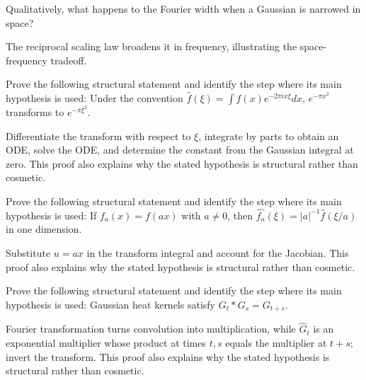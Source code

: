 \begin{problem}\label{prob:iii12-problem-08}
Qualitatively, what happens to the Fourier width when a Gaussian is narrowed in space?
\end{problem}
\begin{solution}
The reciprocal scaling law broadens it in frequency, illustrating the
space-frequency tradeoff.
\end{solution}

\begin{problem}\label{prob:iii12-problem-09}
Prove the following structural statement and identify the step where its main hypothesis is used: Under the convention $\widehat f(\xi)=\int f(x)e^{-2\pi ix\xi}dx$, $e^{-\pi x^2}$ transforms to $e^{-\pi\xi^2}$.
\end{problem}
\begin{solution}
Differentiate the transform with respect to $\xi$, integrate by parts to obtain an ODE, solve the ODE, and determine the constant from the Gaussian integral at zero. This proof also explains why the stated hypothesis is structural rather than cosmetic.
\end{solution}

\begin{problem}\label{prob:iii12-problem-10}
Prove the following structural statement and identify the step where its main hypothesis is used: If $f_a(x)=f(ax)$ with $a\ne0$, then $\widehat{f_a}(\xi)=|a|^{-1}\widehat f(\xi/a)$ in one dimension.
\end{problem}
\begin{solution}
Substitute $u=ax$ in the transform integral and account for the Jacobian. This proof also explains why the stated hypothesis is structural rather than cosmetic.
\end{solution}

\begin{problem}\label{prob:iii12-problem-11}
Prove the following structural statement and identify the step where its main hypothesis is used: Gaussian heat kernels satisfy $G_t*G_s=G_{t+s}$.
\end{problem}
\begin{solution}
Fourier transformation turns convolution into multiplication, while $\widehat G_t$ is an exponential multiplier whose product at times $t,s$ equals the multiplier at $t+s$; invert the transform. This proof also explains why the stated hypothesis is structural rather than cosmetic.
\end{solution}


